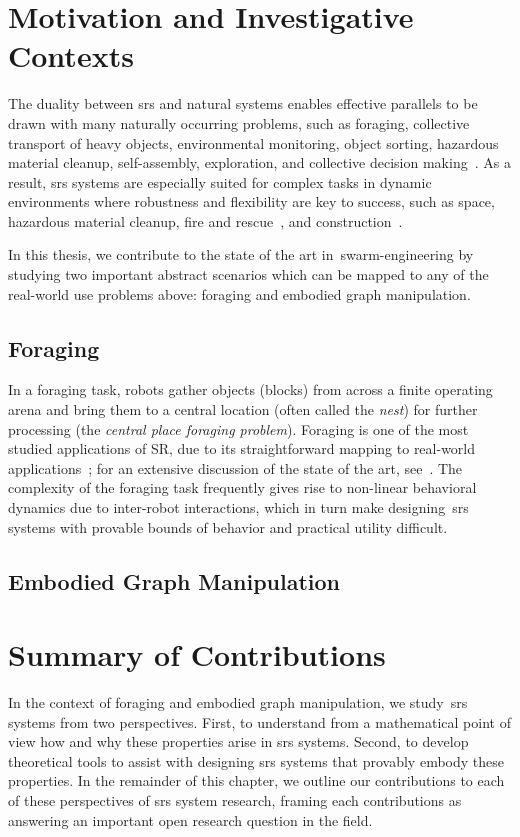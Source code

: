 \section{Motivation and Investigative Contexts}

The duality between \gls{srs} and natural systems enables effective parallels to
be drawn with many naturally occurring problems, such as foraging, collective
transport of heavy objects, environmental monitoring, object sorting, hazardous
material cleanup, self-assembly, exploration, and collective decision
making~\cite{Hecker2015,Kumar2003,CarrilloZapata2020}.  As a result, \gls{srs}
systems are especially suited for complex tasks in dynamic environments where
robustness and flexibility are key to success, such as space, hazardous material
cleanup, fire and
rescue~\cite{Rouff2004,CarrilloZapata2020,Sahin2005,Flushing2014}, and
construction~\cite{Petersen2011}.

In this thesis, we contribute to the state of the art in~\gls{swarm-engineering}
by studying two important abstract scenarios which can be mapped to any of the
real-world use problems above: foraging and embodied graph manipulation.

\subsection{Foraging}
%
In a foraging task, robots gather objects (blocks) from across a finite
operating arena and bring them to a central location (often called the
\emph{nest}) for further processing (the \emph{central place foraging
  problem}). Foraging is one of the most studied applications of SR, due to its
straightforward mapping to real-world applications~\cite{Hecker2015}; for an
extensive discussion of the state of the art, see~\cite{Lu2020}.  The
complexity of the foraging task frequently gives rise to non-linear behavioral
dynamics due to inter-robot interactions, which in turn make designing~\gls{srs}
systems with provable bounds of behavior and practical utility difficult.

\subsection{Embodied Graph Manipulation}

\section{Summary of Contributions}
%
In the context of foraging and embodied graph manipulation, we study~\gls{srs}
systems from two perspectives. First, to understand from a mathematical point of
view how and why these properties arise in \gls{srs} systems. Second, to develop
theoretical tools to assist with designing \gls{srs} systems that provably
embody these properties.  In the remainder of this chapter, we outline our
contributions to each of these perspectives of \gls{srs} system research,
framing each contributions as answering an important open research question in
the field.


